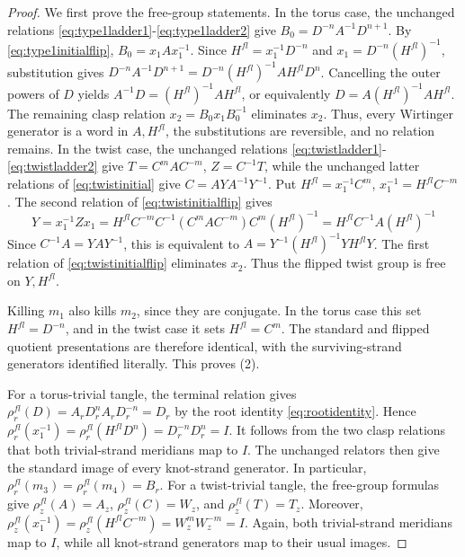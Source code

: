 \documentclass{article}
\theoremstyle{plain}
\theoremstyle{definition}
\theoremstyle{plain}
\theoremstyle{plain}
\theoremstyle{plain}
\theoremstyle{remark}
\theoremstyle{remark}
\theoremstyle{plain}
\theoremstyle{plain}
\newcounter{main}
\theoremstyle{plain}
\theoremstyle{plain}
\begin{document}
\begin{proof}
We first prove the free-group statements. In the torus case, the unchanged relations \eqref{eq:type1ladder1}-\eqref{eq:type1ladder2} give $B_0 = D^{-n}A^{-1}D^{n+1}$. By \eqref{eq:type1initialflip}, $B_0= x_1Ax_1^{-1}$. Since $H^{fl}=x_1^{-1}D^{-n}$ and $x_1 = D^{-n}(H^{fl})^{-1}$, substitution gives $D^{-n}A^{-1}D^{n+1} = D^{-n}(H^{fl})^{-1}AH^{fl}D^n$. Cancelling the outer powers of $D$ yields $A^{-1}D = (H^{fl})^{-1}AH^{fl}$, or equivalently $D = A(H^{fl})^{-1}AH^{fl}$. The remaining clasp relation $x_2 = B_0x_1B_0^{-1}$ eliminates $x_2$. Thus, every Wirtinger generator is a word in $A, H^{fl}$, the substitutions are reversible, and no relation remains. In the twist case, the unchanged relations \eqref{eq:twistladder1}-\eqref{eq:twistladder2} give $T = C^mAC^{-m}$, $Z = C^{-1}T$, while the unchanged latter relations of \eqref{eq:twistinitial} give $C = AYA^{-1}Y^{-1}$. Put $H^{fl} = x_1^{-1}C^m$, $x_1^{-1}=H^{fl}C^{-m}$. The second relation of \eqref{eq:twistinitialflip} gives 
\begin{equation*}
	Y = x_1^{-1}Zx_1 = H^{fl}C^{-m}C^{-1}(C^mAC^{-m})C^m(H^{fl})^{-1} = H^{fl}C^{-1}A(H^{fl})^{-1}
\end{equation*}
Since $C^{-1}A = YAY^{-1}$, this is equivalent to $A = Y^{-1}(H^{fl})^{-1}YH^{fl}Y$. The first relation of \eqref{eq:twistinitialflip} eliminates $x_2$. Thus the flipped twist group is free on $Y, H^{fl}$. 

\medskip

Killing $m_1$ also kills $m_2$, since they are conjugate. In the torus case this set $H^{fl} = D^{-n}$, and in the twist case it sets $H^{fl} = C^m$. The standard and flipped quotient presentations are therefore identical, with the surviving-strand generators identified literally. This proves (2). 

\medskip

For a torus-trivial tangle, the terminal relation gives $\rho_r^{fl}(D) = A_rD_r^nA_rD_r^{-n} = D_r$ by the root identity \eqref{eq:rootidentity}. Hence $\rho_r^{fl}(x_1^{-1}) = \rho_r^{fl}(H^{fl}D^n) = D_r^{-n}D_r^n = I$. It follows from the two clasp relations that both trivial-strand meridians map to $I$. The unchanged relators then give the standard image of every knot-strand generator. In particular, $\rho_r^{fl}(m_3) = \rho_r^{fl}(m_4) = B_r$. For a twist-trivial tangle, the free-group formulas give $\rho_z^{fl}(A) = A_z$, $\rho_z^{fl}(C) = W_z$, and $\rho_z^{fl}(T) = T_z$. Moreover, $\rho_z^{fl}(x_1^{-1}) = \rho_z^{fl}(H^{fl}C^{-m}) = W_z^mW_z^{-m} = I$. Again, both trivial-strand meridians map to $I$, while all knot-strand generators map to their usual images. 


\end{proof}
\end{document}
